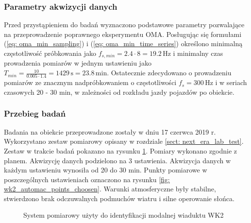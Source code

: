 \subsubsection{Parametry akwizycji danych}
Przed przystąpieniem do badań wyznaczono podstawowe parametry pozwalające na przeprowadzenie poprawnego eksperymentu OMA. Posługując się formułami (\ref{eq: oma_min_sampling}) i (\ref{eq: oma_min_time_series}) określono minimalną częstotliwość próbkowania jako $f_{s,min}=2.4\cdot8=19.2\,\text{Hz}$ i minimalny czas prowadzenia pomiarów w jednym ustawieniu jako $T_{min}=\frac{10}{0.005\cdot1.4}=1429\,\text{s}=23.8\,\text{min}$. Ostatecznie zdecydowano o prowadzeniu pomiarów ze znacznym nadpróbkowaniem o częstotliwości $f_s=300\,\text{Hz}$ i w seriach czasowych 20 - 30 min, w zależności od rozkładu jazdy pojazdów po obiekcie.


\subsubsection{Przebieg badań}
Badania na obiekcie przeprowadzone zostały w dniu 17 czerwca 2019 r. Wykorzystano zestaw pomiarowy opisany w rozdziale \ref{sect: next_era_lab_test}. Zestaw w trakcie badań pokazano na rysunku \ref{fig: wk2_foto_aparatura}. Pomiary wykonano zgodnie z planem. Akwizycję danych podzielono na 3 ustawienia. Akwizycja danych w każdym ustawieniu wynosiła od 20 do 30 min. Punkty pomiarowe w poszczególnych ustawieniach oznaczono na rysunku \ref{fig: wk2_automac_points_choosen}. Warunki atmosferyczne były stabilne, stwierdzono brak odczuwalnych podmuchów wiatru i silne operowanie słońca.

\begin{figure}[hbt!]
	\centering
	 \quad 
	\captionsetup{justification=centering}
	\caption{System pomiarowy użyty do identyfikacji modalnej wiaduktu WK2}
	\label{fig: wk2_foto_aparatura}
\end{figure}

